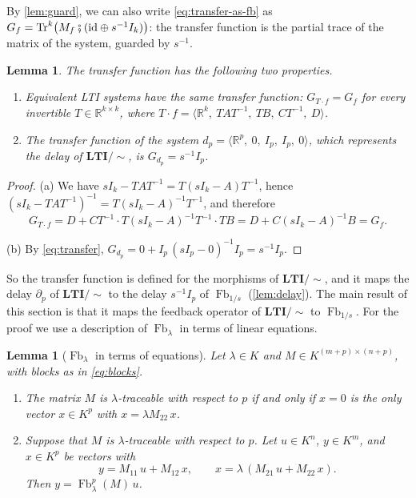 \documentclass[11pt,a4paper]{article}
\theoremstyle{plain}
\newtheorem{lemma}[theorem]{Lemma}
\theoremstyle{definition}
\theoremstyle{remark}
\DeclareMathOperator{\Fb}{Fb}
\DeclareMathOperator{\Tr}{Tr}
\newcommand{\R}{\mathbb{R}}
\newcommand{\id}{\mathrm{id}}
\newcommand{\then}{\mathbin{\fatsemi}}
\newcommand{\LTIq}{\mathbf{LTI}/{\sim}}
\newcommand{\sys}[5]{\bigl\langle #1,\ #2,\ #3,\ #4,\ #5 \bigr\rangle}
\begin{document}
By \cref{lem:guard}, we can also write \cref{eq:transfer-as-fb} as $G_f = \Tr^k\bigl( M_f \then (\id \oplus s^{-1} I_k) \bigr)$: the transfer function is the partial trace of the matrix of the system, guarded by $s^{-1}$.

\begin{lemma}
    \label{lem:transfer-basic}
    The transfer function has the following two properties.
    \begin{enumerate}[label=\textup{(\alph*)}]
        \item Equivalent LTI systems have the same transfer function: $G_{T \cdot f} = G_f$ for every invertible $T \in \R^{k \times k}$, where $T \cdot f = \sys{\R^k}{T A T^{-1}}{T B}{C T^{-1}}{D}$.
        \item The transfer function of the system $d_p = \sys{\R^p}{0}{I_p}{I_p}{0}$, which represents the delay of $\LTIq$, is $G_{d_p} = s^{-1} I_p$.
    \end{enumerate}
\end{lemma}

\begin{proof}
    (a) We have $s I_k - T A T^{-1} = T (s I_k - A) T^{-1}$, hence $(s I_k - T A T^{-1})^{-1} = T (s I_k - A)^{-1} T^{-1}$, and therefore
    \begin{equation*}
        G_{T \cdot f} = D + C T^{-1} \cdot T (s I_k - A)^{-1} T^{-1} \cdot T B = D + C (s I_k - A)^{-1} B = G_f .
    \end{equation*}

    (b) By \cref{eq:transfer}, $G_{d_p} = 0 + I_p\, (s I_p - 0)^{-1} I_p = s^{-1} I_p$.
\end{proof}

So the transfer function is defined for the morphisms of $\LTIq$, and it maps the delay $\partial_p$ of $\LTIq$ to the delay $s^{-1} I_p$ of $\Fb_{1/s}$ (\cref{lem:delay}).
The main result of this section is that it maps the feedback operator of $\LTIq$ to $\Fb_{1/s}$.
For the proof we use a description of $\Fb_\lambda$ in terms of linear equations.

\begin{lemma}[$\Fb_\lambda$ in terms of equations]
    \label{lem:equations}
    Let $\lambda \in K$ and $M \in K^{(m+p) \times (n+p)}$, with blocks as in \cref{eq:blocks}.
    \begin{enumerate}[label=\textup{(\alph*)}]
        \item The matrix $M$ is $\lambda$-traceable with respect to $p$ if and only if $x = 0$ is the only vector $x \in K^p$ with $x = \lambda M_{22}\, x$.
        \item Suppose that $M$ is $\lambda$-traceable with respect to $p$.
              Let $u \in K^n$, $y \in K^m$, and $x \in K^p$ be vectors with
              \begin{equation}
                  \label{eq:loop-equations}
                  y = M_{11}\, u + M_{12}\, x,
                  \qquad
                  x = \lambda\, ( M_{21}\, u + M_{22}\, x ) .
              \end{equation}
              Then $y = \Fb^p_\lambda(M)\, u$.
    \end{enumerate}
\end{lemma}
\end{document}
